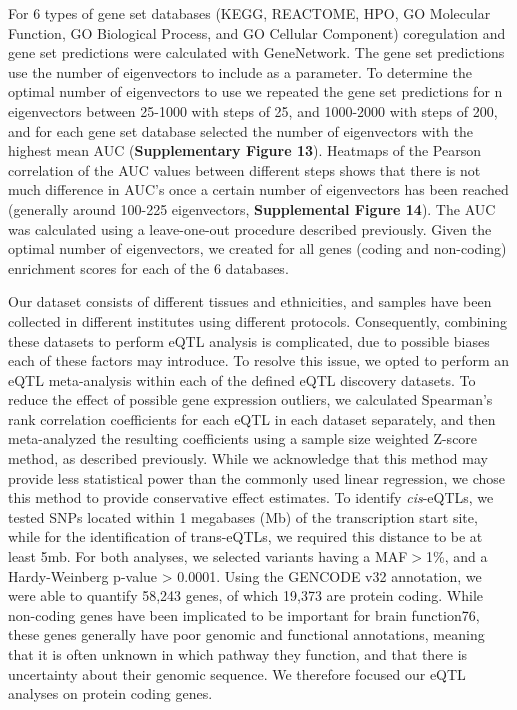 For 6 types of gene set databases (KEGG, REACTOME, HPO, GO Molecular Function, GO Biological Process, and GO Cellular Component) coregulation and gene set predictions were calculated with GeneNetwork. The gene set predictions use the number of eigenvectors to include as a parameter. To determine the optimal number of eigenvectors to use we repeated the gene set predictions for n eigenvectors between 25-1000 with steps of 25, and 1000-2000 with steps of 200, and for each gene set database selected the number of eigenvectors with the highest mean AUC (\textbf{Supplementary Figure 13}). Heatmaps of the Pearson correlation of the AUC values between different steps shows that there is not much difference in AUC’s once a certain number of eigenvectors has been reached (generally around 100-225 eigenvectors, \textbf{Supplemental Figure 14}). The AUC was calculated using a leave-one-out procedure described previously\cite{jassalReactomePathwayKnowledgebase2020}. Given the optimal number of eigenvectors, we created for all genes (coding and non-coding) enrichment scores for each of the 6 databases. 

Our dataset consists of different tissues and ethnicities, and samples have been collected in different institutes using different protocols. Consequently, combining these datasets to perform eQTL analysis is complicated, due to possible biases each of these factors may introduce. To resolve this issue, we opted to perform an eQTL meta-analysis within each of the defined eQTL discovery datasets. To reduce the effect of possible gene expression outliers, we calculated Spearman’s rank correlation coefficients for each eQTL in each dataset separately, and then meta-analyzed the resulting coefficients using a sample size weighted Z-score method, as described previously\cite{vosaUnravelingPolygenicArchitecture2018}. While we acknowledge that this method may provide less statistical power than the commonly used linear regression, we chose this method to provide conservative effect estimates. To identify \emph{cis}-eQTLs, we tested SNPs located within 1 megabases (Mb) of the transcription start site, while for the identification of trans-eQTLs, we required this distance to be at least 5mb. For both analyses, we selected variants having a MAF$>$1\%, and a Hardy-Weinberg p-value > 0.0001. Using the GENCODE v32 annotation, we were able to quantify 58,243 genes, of which 19,373 are protein coding. While non-coding genes have been implicated to be important for brain function76, these genes generally have poor genomic and functional annotations, meaning that it is often unknown in which pathway they function, and that there is uncertainty about their genomic sequence. We therefore focused our eQTL analyses on protein coding genes. 

